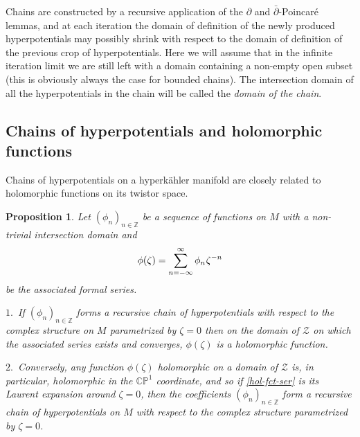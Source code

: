 \documentclass[11pt]{amsart}
\newtheorem{proposition}[theorem]{Proposition}
\theoremstyle{remark}
\theoremstyle{remark}
\theoremstyle{definition}
\theoremstyle{definition}
\theoremstyle{definition}
\newcommand{\0}{{\scriptstyle 0'}} %
\newcommand{\1}{{\scriptstyle 1'}}
\newcommand{\pt}{\hspace{1pt}} %
\newcommand{\hp}{\hspace{0.5pt}} %
\begin{document}
Chains are constructed by a recursive application of the $\partial$ and $\bar{\partial}$\pt-\hp Poincar\'e lemmas, and at each iteration the domain of definition of the newly produced hyperpotentials may possibly shrink with respect to the domain of definition of the previous crop of hyperpotentials. Here we will assume that in the infinite iteration limit we are still left with a domain containing a non-empty open subset (this is obviously always the case for bounded chains). %
The intersection domain of all the hyperpotentials in the chain will be called the \textit{domain of the chain}. 



\subsection{Chains of hyperpotentials and holomorphic functions} \hfill \medskip



Chains of hyperpotentials on a hyperk\"ahler manifold are closely related to holomorphic functions on its twistor space.

\begin{proposition} \label{hol-hyper(1,1)}
Let $(\phi_n)_{n \in \mathbb{Z}}$ be a sequence of functions on $M$ with a non-trivial intersection domain and
\begin{equation} \label{hol-fct-ser}
\phi(\zeta) = \sum_{n=-\infty}^{\infty} \phi_{n} \hp \zeta^{-n}
\end{equation}
be the associated formal series. \smallskip

$1.$~If $(\phi_n)_{n \in \mathbb{Z}}$ forms a recursive chain of hyperpotentials with respect to the complex structure on $M$ parametrized by $\zeta = 0$ then on the domain of $\mathcal{Z}$ on which the associated series exists and converges, $\phi(\zeta)$ is a holomorphic function. \smallskip

$2.$~Conversely, any function $\phi(\zeta)$ holomorphic on a domain of $\mathcal{Z}$ is, in particular, holomorphic in the $\mathbb{CP}^1$ coordinate, and so if \eqref{hol-fct-ser} is its Laurent expansion around $\zeta=0$, then the coefficients $(\phi_n)_{n \in \mathbb{Z}}$ form a recursive chain of hyperpotentials on $M$ with respect to the complex structure parametrized by $\zeta = 0$.
\end{proposition}
\end{document}
